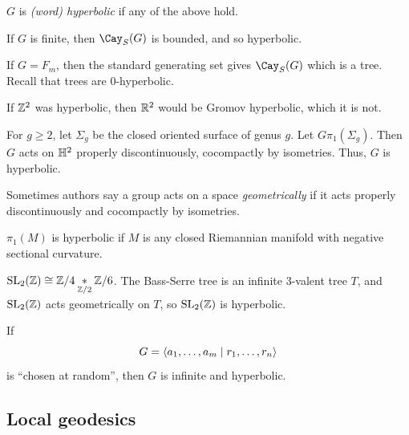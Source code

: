 \documentclass{article}
\begin{document}
\begin{definition}
    \(G\) is \emph{(word) hyperbolic} if any of the above hold.
\end{definition}

\lec

\begin{example}
    If \(G\) is finite, then \(\Cay_S(G)\) is bounded, and so hyperbolic.
\end{example}

\begin{example}
    If \(G = F_m\), then the standard generating set gives \(\Cay_S(G)\) which is a tree. Recall that trees are \(0\)-hyperbolic.
\end{example}

\begin{example}
    If \(\mathbb{Z}^2\) was hyperbolic, then \(\mathbb{R}^2\) would be Gromov hyperbolic, which it is not.
\end{example}

\begin{example}
    For \(g \ge 2\), let \(\Sigma_g\) be the closed oriented surface of genus \(g\). Let \(G \pi_1(\Sigma_g)\). Then \(G\) acts on \(\mathbb{H}^2\) properly discontinuously, cocompactly by isometries. Thus, \(G\) is hyperbolic.
\end{example}

\begin{remark}
    Sometimes authors say a group acts on a space \emph{geometrically} if it acts properly discontinuously and cocompactly by isometries.
\end{remark}

\begin{example}
    \(\pi_1(M)\) is hyperbolic if \(M\) is any closed Riemannian manifold with negative sectional curvature.
\end{example}

\begin{example}
    \(\operatorname{SL}_2(\mathbb{Z}) \cong \mathbb{Z}/4 \underset{\mathbb{Z}/2}{*} \mathbb{Z}/6\). The Bass-Serre tree is an infinite \(3\)-valent tree \(T\), and \(\operatorname{SL}_2(\mathbb{Z})\) acts geometrically on \(T\), so \(\operatorname{SL}_2(\mathbb{Z})\) is hyperbolic.
\end{example}

\begin{example}
     If
    \[G = \left\langle a_1, \dots, a_m \mid r_1, \dots, r_n \right\rangle\]
    is ``chosen at random'', then \(G\) is infinite and hyperbolic.
\end{example}

\subsection{Local geodesics}
\end{document}
